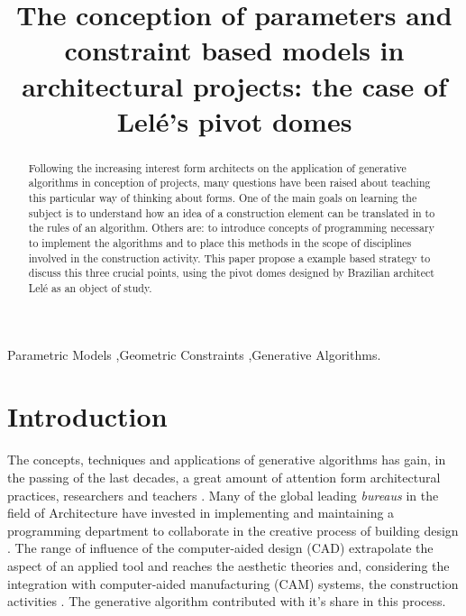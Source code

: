 \documentclass[preprint,12pt,3p]{elsarticle}
\begin{document}
\begin{frontmatter}

\title{The conception of parameters and constraint based models in architectural projects: the case of Lel\'e's pivot domes}





\begin{abstract}

Following the increasing interest form architects on the application of generative algorithms in conception of projects, many questions have been raised about teaching this particular way of thinking about forms. One of the main goals on learning the subject is to understand how an idea of a construction element can be translated in to the rules of an algorithm. Others are: to introduce concepts of programming necessary to implement the algorithms and to place this methods in the scope of disciplines involved in the construction activity. This paper propose a example based strategy to discuss this three crucial points, using the pivot domes designed by Brazilian architect Lel\'e as an object of study. 

\end{abstract}

\begin{keyword}
Parametric Models \sep Geometric Constraints \sep Generative Algorithms.
\end{keyword}

\end{frontmatter}


\section{Introduction}
\label{sec1}

The concepts, techniques and applications of generative algorithms has gain, in the passing of the last decades, a great amount of attention form architectural practices, researchers and teachers \cite{krish2011}. Many of the global leading \textit{bureaus} in the field of Architecture have invested in implementing and maintaining a programming department to collaborate in the creative process of building design \cite{ceccato2010mbg}. The range of influence of the computer-aided design (CAD) extrapolate the aspect of an applied tool and reaches the aesthetic theories \cite{Oxman2006} \cite{picon2011} and, considering the integration with computer-aided manufacturing (CAM) systems, the construction activities \cite{kolarevic2003}. The generative algorithm contributed with it's share in this process.
\end{document}
